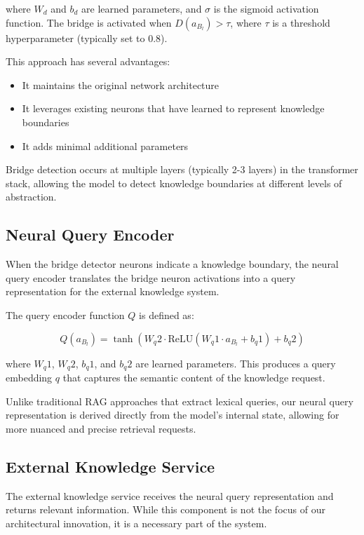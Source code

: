 \documentclass[9pt,a4paper,twocolumn,twoside]{tau-class/tau}
\begin{document}
    where $W_d$ and $b_d$ are learned parameters, and $\sigma$ is the sigmoid activation function. The bridge is activated when $D(a_{B_l}) > \tau$, where $\tau$ is a threshold hyperparameter (typically set to 0.8).

    This approach has several advantages:
    \begin{itemize}
        \item It maintains the original network architecture
        \item It leverages existing neurons that have learned to represent knowledge boundaries
        \item It adds minimal additional parameters
    \end{itemize}

    Bridge detection occurs at multiple layers (typically 2-3 layers) in the transformer stack, allowing the model to detect knowledge boundaries at different levels of abstraction.

\subsection{Neural Query Encoder}

    When the bridge detector neurons indicate a knowledge boundary, the neural query encoder translates the bridge neuron activations into a query representation for the external knowledge system.

    The query encoder function $Q$ is defined as:

    \begin{equation}
        Q(a_{B_l}) = \tanh(W_q2 \cdot \text{ReLU}(W_q1 \cdot a_{B_l} + b_q1) + b_q2)
    \end{equation}

    where $W_q1$, $W_q2$, $b_q1$, and $b_q2$ are learned parameters. This produces a query embedding $q$ that captures the semantic content of the knowledge request.

    Unlike traditional RAG approaches that extract lexical queries, our neural query representation is derived directly from the model's internal state, allowing for more nuanced and precise retrieval requests.

\subsection{External Knowledge Service}

    The external knowledge service receives the neural query representation and returns relevant information. While this component is not the focus of our architectural innovation, it is a necessary part of the system.
\end{document}
